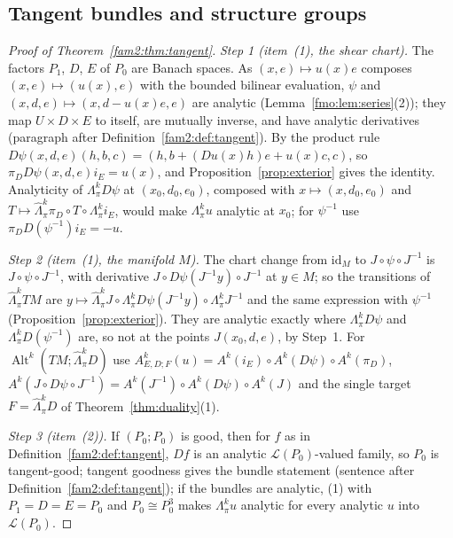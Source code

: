 \documentclass[11pt]{amsart}
\theoremstyle{definition}
\theoremstyle{remark}
\numberwithin{equation}{section}
\newcommand{\cL}{\mathcal L}
\newcommand{\Alt}{\operatorname{Alt}}
\newcommand{\id}{\mathrm{id}}
\theoremstyle{plain}
\theoremstyle{definition}
\theoremstyle{plain}
\newcommand{\hLambda}{\widehat\Lambda}
\begin{document}
\subsection{Tangent bundles and structure groups}\label{fmo:ssec:tangent}

\begin{proof}[Proof of Theorem~\ref{fam2:thm:tangent}]
\emph{Step 1 (item~(1), the shear chart).} The factors $P_1$, $D$, $E$ of $P_0$ are Banach spaces. As $(x,e)\mapsto u(x)e$
composes $(x,e)\mapsto(u(x),e)$ with the bounded bilinear evaluation, $\psi$ and $(x,d,e)\mapsto(x,d-u(x)e,e)$ are
analytic (Lemma~\ref{fmo:lem:series}(2)); they map $U\times D\times E$ to itself, are mutually inverse, and have analytic
derivatives (paragraph after Definition~\ref{fam2:def:tangent}). By the product rule $D\psi(x,d,e)(h,b,c)=(h,b+(Du(x)h)e+
u(x)c,c)$, so $\pi_DD\psi(x,d,e)i_E=u(x)$, and Proposition~\ref{prop:exterior} gives the identity. Analyticity of
$\Lambda^k_\pi D\psi$ at $(x_0,d_0,e_0)$, composed with $x\mapsto(x,d_0,e_0)$ and $T\mapsto\hLambda^k_\pi\pi_D\circ T\circ
\Lambda^k_\pi i_E$, would make $\Lambda^k_\pi u$ analytic at $x_0$; for $\psi^{-1}$ use $\pi_DD(\psi^{-1})i_E=-u$.

\emph{Step 2 (item~(1), the manifold $M$).} The chart change from $\id_M$ to $J\circ\psi\circ J^{-1}$ is
$J\circ\psi\circ J^{-1}$, with derivative $J\circ D\psi(J^{-1}y)\circ J^{-1}$ at $y\in M$; so the transitions of
$\hLambda^k_\pi TM$ are $y\mapsto\hLambda^k_\pi J\circ\Lambda^k_\pi D\psi(J^{-1}y)\circ\Lambda^k_\pi J^{-1}$ and the same
expression with $\psi^{-1}$ (Proposition~\ref{prop:exterior}). They are analytic exactly where $\Lambda^k_\pi D\psi$ and
$\Lambda^k_\pi D(\psi^{-1})$ are, so not at the points $J(x_0,d,e)$, by Step~1. For $\Alt^k(TM;\hLambda^k_\pi D)$ use
$A^k_{E,D;F}(u)=A^k(i_E)\circ A^k(D\psi)\circ A^k(\pi_D)$, $A^k(J\circ D\psi\circ J^{-1})=A^k(J^{-1})\circ A^k(D\psi)\circ
A^k(J)$ and the single target $F=\hLambda^k_\pi D$ of Theorem~\ref{thm:duality}(1).

\emph{Step 3 (item~(2)).} If $(P_0;P_0)$ is good, then for $f$ as in Definition~\ref{fam2:def:tangent}, $Df$ is an
analytic $\cL(P_0)$-valued family, so $P_0$ is tangent-good; tangent goodness gives the bundle statement (sentence after
Definition~\ref{fam2:def:tangent}); if the bundles are analytic, (1) with $P_1=D=E=P_0$ and $P_0\cong P_0^3$ makes
$\Lambda^k_\pi u$ analytic for every analytic $u$ into $\cL(P_0)$.


\end{proof}
\end{document}
